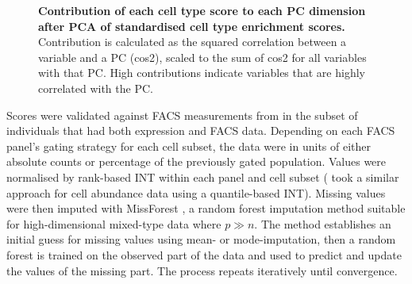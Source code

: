 \begin{figure}
\begin{subfigure}[b]{0.65\textwidth}
    \end{subfigure}
    \caption[
    ]{
        \textbf{Contribution of each cell type score to each \gls{PC} dimension after \gls{PCA} of standardised  cell type enrichment scores.}
        Contribution is calculated as the squared correlation between a variable and a \gls{PC} (cos2), 
        scaled to the sum of cos2 for all variables with that \gls{PC}.
        High contributions indicate variables that are highly correlated with the \gls{PC}.
    }
    \label{fig:hird_xCell_cos2}
\end{figure}

Scores were validated against \gls{FACS} measurements from \textcite{sobolev2016AdjuvantedInfluenzaH1N1Vaccination} in the subset of  individuals that had both expression and \gls{FACS} data.
Depending on each \gls{FACS} panel's gating strategy for each cell subset, the data were in units of either absolute counts or percentage of the previously gated population.
Values were normalised by rank-based \gls{INT} within each panel and cell subset (\textcite{astle2016AllelicLandscapeHuman} took a similar approach for cell abundance data using a quantile-based \gls{INT}).
%
Missing values were then imputed with MissForest \autocite{stekhoven2012MissForestNonparametricMissing}, a random forest imputation method suitable for high-dimensional mixed-type data where $p \gg n$.
The method establishes an initial guess for missing values using mean- or mode-imputation, then a random forest is trained on the observed part of the data and used to predict and update the values of the missing part.
The process repeats iteratively until convergence.


